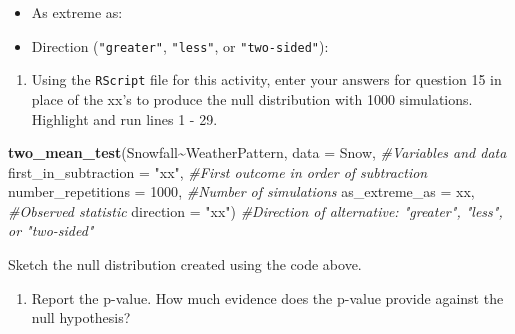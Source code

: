 \documentclass[
]{report}
\newenvironment{Shaded}{\begin{snugshade}}{\end{snugshade}}
\newcommand{\CommentTok}[1]{\textcolor[rgb]{0.56,0.35,0.01}{\textit{#1}}}
\newcommand{\DataTypeTok}[1]{\textcolor[rgb]{0.13,0.29,0.53}{#1}}
\newcommand{\DecValTok}[1]{\textcolor[rgb]{0.00,0.00,0.81}{#1}}
\newcommand{\KeywordTok}[1]{\textcolor[rgb]{0.13,0.29,0.53}{\textbf{#1}}}
\newcommand{\NormalTok}[1]{#1}
\newcommand{\OperatorTok}[1]{\textcolor[rgb]{0.81,0.36,0.00}{\textbf{#1}}}
\newcommand{\StringTok}[1]{\textcolor[rgb]{0.31,0.60,0.02}{#1}}
\providecommand{\tightlist}{%
  \setlength{\itemsep}{0pt}\setlength{\parskip}{0pt}}
\begin{document}
\begin{itemize}
\tightlist
\item
  As extreme as:
\end{itemize}

\vspace{.2in}

\begin{itemize}
\tightlist
\item
  Direction (\texttt{"greater"}, \texttt{"less"}, or \texttt{"two-sided"}):
\end{itemize}

\vspace{.2in}

\begin{enumerate}
\def\labelenumi{\arabic{enumi}.}
\setcounter{enumi}{15}
\tightlist
\item
  Using the \texttt{RScript} file for this activity, enter your answers for question 15 in place of the xx's to produce the null distribution with 1000 simulations. Highlight and run lines 1 - 29.
\end{enumerate}

\begin{Shaded}
\begin{Highlighting}[]
\KeywordTok{two\_mean\_test}\NormalTok{(Snowfall}\OperatorTok{\textasciitilde{}}\NormalTok{WeatherPattern, }\DataTypeTok{data =}\NormalTok{ Snow,  }\CommentTok{\#Variables and data}
                    \DataTypeTok{first\_in\_subtraction =} \StringTok{"xx"}\NormalTok{, }\CommentTok{\#First outcome in order of subtraction}
                    \DataTypeTok{number\_repetitions =} \DecValTok{1000}\NormalTok{,  }\CommentTok{\#Number of simulations}
                    \DataTypeTok{as\_extreme\_as =}\NormalTok{ xx,  }\CommentTok{\#Observed statistic}
                    \DataTypeTok{direction =} \StringTok{"xx"}\NormalTok{)  }\CommentTok{\#Direction of alternative: "greater", "less", or "two{-}sided"}
\end{Highlighting}
\end{Shaded}

Sketch the null distribution created using the code above.
\vspace{1.5in}

\begin{enumerate}
\def\labelenumi{\arabic{enumi}.}
\setcounter{enumi}{16}
\tightlist
\item
  Report the p-value. How much evidence does the p-value provide against the null hypothesis?
\end{enumerate}
\end{document}
